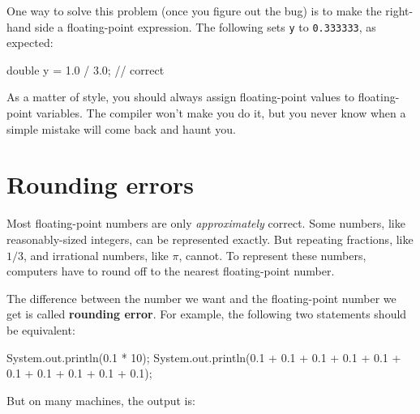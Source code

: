 \documentclass[12pt]{book}
\theoremstyle{exercise}
\newcommand{\java}[1]{\verb"#1"}
\begin{document}
One way to solve this problem (once you figure out the bug) is to make the right-hand side a floating-point expression.
The following sets \java{y} to \java{0.333333}, as expected:

\begin{code}
    double y = 1.0 / 3.0;  // correct
\end{code}

As a matter of style, you should always assign floating-point values to floating-point variables.
The compiler won't make you do it, but you never know when a simple mistake will come back and haunt you.


\section{Rounding errors}



Most floating-point numbers are only {\it approximately} correct.
Some numbers, like reasonably-sized integers, can be represented exactly.
But repeating fractions, like $1/3$, and irrational numbers, like $\pi$, cannot.
To represent these numbers, computers have to round off to the nearest floating-point number.



The difference between the number we want and the floating-point number we get is called {\bf rounding error}.
For example, the following two statements should be equivalent:

\begin{code}
    System.out.println(0.1 * 10);
    System.out.println(0.1 + 0.1 + 0.1 + 0.1 + 0.1
                     + 0.1 + 0.1 + 0.1 + 0.1 + 0.1);
\end{code}

But on many machines, the output is:
\end{document}
